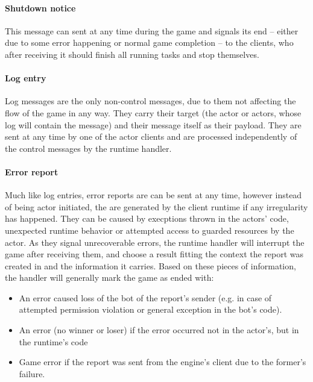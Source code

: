 \documentclass[11pt,a4paper,oneside]{report}
\begin{document}
			\paragraph{Shutdown notice}
			
			This message can sent at any time during the game and signals its end -- either due to some error happening or normal game completion -- to the clients, who after receiving it should finish all running tasks and stop themselves.
		
			\paragraph{Log entry}
			
			Log messages are the only non-control messages, due to them not affecting the flow of the game in any way. They carry their target (the actor or actors, whose log will contain the message) and their message itself as their payload. They are sent at any time by one of the actor clients and are processed independently of the control messages by the runtime handler.
			
			\paragraph{Error report}
			
			Much like log entries, error reports are can be sent at any time, however instead of being actor initiated, the are generated by the client runtime if any irregularity has happened. They can be caused by execptions thrown in the actors' code, unexpected runtime behavior or attempted access to guarded resources by the actor. As they signal unrecoverable errors, the runtime handler will interrupt the game after receiving them, and choose a result fitting the context the report was created in and the information it carries.
			Based on these pieces of information, the handler will generally mark the game as ended with:
			
			\begin{itemize}
				\item An error caused loss of the bot of the report's sender (e.g. in case of attempted permission violation or general exception in the bot's code).
				
				\item An error (no winner or loser) if the error occurred not in the actor's, but in the runtime's code
				
				\item Game error if the report was sent from the engine's client due to the former's failure. 
			\end{itemize}
			
\end{document}

